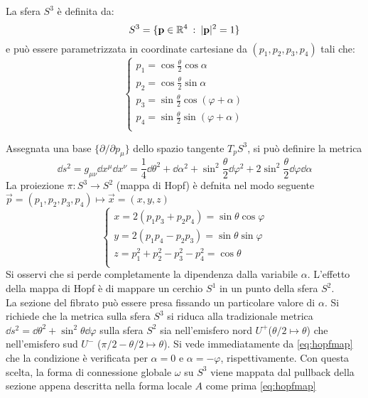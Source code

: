 La sfera $S^3$ è definita da:
$$ S^3 = \{ \mathbf{p} \in \mathbb{R}^4 \: : \: |\mathbf{p}|^2 = 1 \} $$
e può essere parametrizzata in coordinate cartesiane da $(p_1,p_2,p_3,p_4)$
tali che:
\begin{equation}
   \begin{cases}
      p_1 = \cos \frac{\theta}{2} \cos \alpha \\
      p_2 = \cos \frac{\theta}{2} \sin \alpha \\
      p_3 = \sin \frac{\theta}{2} \cos (\varphi  + \alpha) \\
      p_4 = \sin \frac{\theta}{2} \sin (\varphi  + \alpha) \\
   \end{cases}
\end{equation}

Assegnata una base $ \{ \partial/\partial p_\mu \} $ dello spazio tangente
$T_p S^3$, si può definire la metrica
\begin{equation}
   \dd  s^2 = g_{\mu\nu} \dd x^\mu \dd x^\nu
         = \frac{1}{4} \dd \theta^2 + \dd \alpha^2 + \sin^2\frac{\theta}{2}\dd \varphi ^2
         + 2\sin^2\frac{\theta}{2} \dd \varphi  \dd \alpha
\end{equation}
La proiezione $\pi : S^3 \to S^2$ (mappa di Hopf) è defnita nel modo seguente
$\vec p = (p_1,p_2,p_3,p_4) \mapsto \vec x = (x,y,z)$
\begin{equation}\label{eq:hopfmap}
   \begin{cases}
      x = 2(p_1 p_3 + p_2 p_4)          = \sin\theta \cos\varphi  \\
      y = 2(p_1 p_4 - p_2 p_3)          = \sin\theta \sin\varphi  \\
      z = p_1^2 + p_2^2 - p_3^2 - p_4^2 = \cos\theta          \\
   \end{cases}
\end{equation}
Si osservi che si perde completamente la dipendenza dalla variabile $\alpha$.
L'effetto della mappa di Hopf è di mappare un cerchio $S^1$ in un punto
della sfera $S^2$.\\

La sezione del fibrato può essere presa fissando un particolare valore di $\alpha$.
Si richiede che la metrica sulla sfera $S^3$ si riduca alla tradizionale metrica
$\dd s^2 = \dd \theta^2 + \sin^2\theta \dd \varphi $ sulla sfera $S^2$ sia nell'emisfero
nord $U^+$($ \theta/2 \mapsto \theta $) che nell'emisfero sud $U^-$
($\pi /2 - \theta /2 \mapsto \theta $). Si vede immediatamente da \ref{eq:hopfmap} che la
condizione è verificata per $\alpha = 0$ e $\alpha = -\varphi $, rispettivamente.
Con questa scelta, la forma di connessione globale $\omega$ su $S^3$
viene mappata dal pullback della sezione appena descritta nella forma locale $A$
come prima \ref{eq:hopfmap}\\

